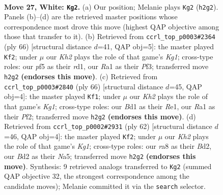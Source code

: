 \documentclass[11pt]{article}
\begin{document}
\clearpage

\begin{figure}[p]\centering
\begin{subfigure}{0.46\textwidth}\centering
\resizebox{\linewidth}{!}{%
\newchessgame
\chessboard[
  setfen={r1b3k1/3n4/1p4p1/2p2p2/2P2P2/p1P3P1/P2B3K/R2B4 w - - 3 27},
  showmover=false,
  pgfstyle=straightmove, color=movearrow, markmove={h2-g2}
]}
\caption{}
\end{subfigure}\hfill
\begin{subfigure}{0.46\textwidth}\centering
\resizebox{\linewidth}{!}{%
\newchessgame
\chessboard[
  setfen={8/1pp3pk/4n2p/P3Pp2/P7/R1B2P1P/6P1/3r2K1 w - - 0 34},
  showmover=false,
  pgfstyle=straightmove, color=movearrow, markmove={g1-f2}
]}
\caption{}
\end{subfigure}
\\[4pt]
\begin{subfigure}{0.46\textwidth}\centering
\resizebox{\linewidth}{!}{%
\newchessgame
\chessboard[
  setfen={6k1/5pp1/pnrPp2p/1p2P2P/1B6/P7/5PP1/4R1K1 w - - 0 34},
  showmover=false,
  pgfstyle=straightmove, color=movearrow, markmove={g1-f1}
]}
\caption{}
\end{subfigure}\hfill
\begin{subfigure}{0.46\textwidth}\centering
\resizebox{\linewidth}{!}{%
\newchessgame
\chessboard[
  setfen={1r4k1/5p2/3p1bp1/N2Pp2n/4P2p/5P2/3B2PP/2R3K1 w - - 5 32},
  showmover=false,
  pgfstyle=straightmove, color=movearrow, markmove={g1-f2}
]}
\caption{}
\end{subfigure}
\caption{\textbf{Move 27, White: \texttt{Kg2}.} (a) Our position; Melanie plays \texttt{Kg2} (\texttt{h2g2}). Panels (b)--(d) are the retrieved master positions whose correspondence most drove this move (highest QAP objective among those that transfer to it). (b) Retrieved from \texttt{ccrl\_top\_p0003\#2364} (ply 66) [structural distance $d$=41, QAP obj=5]: the master played \texttt{Kf2}; under $\mu$ our \emph{Kh2} plays the role of that game's \emph{Kg1}; cross-type roles: our \emph{p}f5 as their \emph{r}d1, our \emph{R}a1 as their \emph{P}f3; transferred move \texttt{h2g2} \textbf{(endorses this move)}. (c) Retrieved from \texttt{ccrl\_top\_p0003\#2840} (ply 66) [structural distance $d$=45, QAP obj=4]: the master played \texttt{Kf1}; under $\mu$ our \emph{Kh2} plays the role of that game's \emph{Kg1}; cross-type roles: our \emph{B}d1 as their \emph{R}e1, our \emph{R}a1 as their \emph{P}f2; transferred move \texttt{h2g2} \textbf{(endorses this move)}. (d) Retrieved from \texttt{ccrl\_top\_p0002\#2931} (ply 62) [structural distance $d$=46, QAP obj=4]: the master played \texttt{Kf2}; under $\mu$ our \emph{Kh2} plays the role of that game's \emph{Kg1}; cross-type roles: our \emph{r}a8 as their \emph{B}d2, our \emph{B}d2 as their \emph{N}a5; transferred move \texttt{h2g2} \textbf{(endorses this move)}. Synthesis: 9 retrieved analogs transferred to \texttt{Kg2} (summed QAP objective 32, the strongest correspondence among the candidate moves); Melanie committed it via the \texttt{search} selector.}
\label{fig:thought-m52}
\end{figure}
\end{document}

